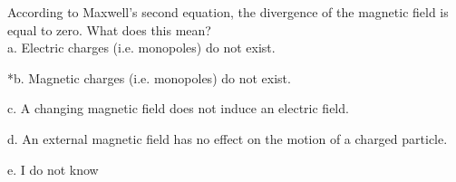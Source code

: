 
According to Maxwell's second equation, the divergence of the magnetic field is equal to zero. What does this mean? \\

a. Electric charges (i.e. monopoles) do not exist.

*b. Magnetic charges (i.e. monopoles) do not exist.

c. A changing magnetic field does not induce an electric field.

d. An external magnetic field has no effect on the motion of a charged particle.

e. I do not know \\
